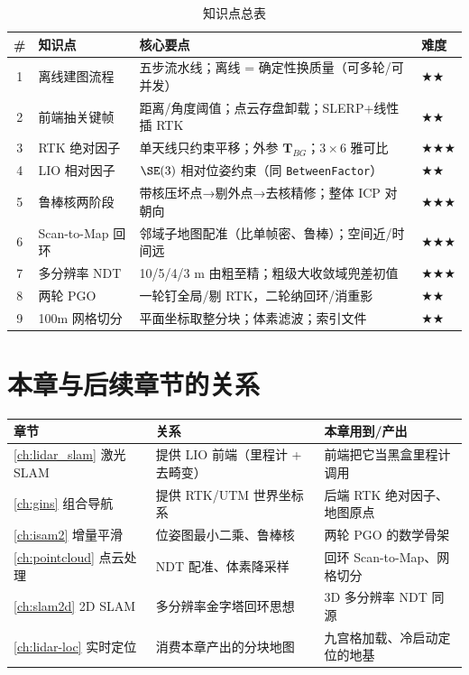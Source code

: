 \begin{table}[H]\centering\small
\caption{知识点总表}
\label{tab:lidar-map-summary}
\begin{tabular}{clll}
\toprule
\# & 知识点 & 核心要点 & 难度 \\
\midrule
1 & 离线建图流程 & 五步流水线；离线 = 确定性换质量（可多轮/可并发） & $\bigstar\bigstar$ \\
2 & 前端抽关键帧 & 距离/角度阈值；点云存盘卸载；SLERP+线性插 RTK & $\bigstar\bigstar$ \\
3 & RTK 绝对因子 & 单天线只约束平移；外参 $\mathbf{T}_{BG}$；$3\times6$ 雅可比 & $\bigstar\bigstar\bigstar$ \\
4 & LIO 相对因子 & $\SE(3)$ 相对位姿约束（同 \texttt{BetweenFactor}） & $\bigstar\bigstar$ \\
5 & 鲁棒核两阶段 & 带核压坏点→剔外点→去核精修；整体 ICP 对朝向 & $\bigstar\bigstar\bigstar$ \\
6 & Scan-to-Map 回环 & 邻域子地图配准（比单帧密、鲁棒）；空间近/时间远 & $\bigstar\bigstar\bigstar$ \\
7 & 多分辨率 NDT & 10/5/4/3 m 由粗至精；粗级大收敛域兜差初值 & $\bigstar\bigstar\bigstar$ \\
8 & 两轮 PGO & 一轮钉全局/剔 RTK，二轮纳回环/消重影 & $\bigstar\bigstar$ \\
9 & 100m 网格切分 & 平面坐标取整分块；体素滤波；索引文件 & $\bigstar\bigstar$ \\
\bottomrule
\end{tabular}
\end{table}

\section*{本章与后续章节的关系}
\begin{table}[H]\centering\small
\begin{tabular}{lll}
\toprule
章节 & 关系 & 本章用到/产出 \\
\midrule
\cref{ch:lidar_slam} 激光 SLAM & 提供 LIO 前端（里程计 + 去畸变） & 前端把它当黑盒里程计调用 \\
\cref{ch:gins} 组合导航 & 提供 RTK/UTM 世界坐标系 & 后端 RTK 绝对因子、地图原点 \\
\cref{ch:isam2} 增量平滑 & 位姿图最小二乘、鲁棒核 & 两轮 PGO 的数学骨架 \\
\cref{ch:pointcloud} 点云处理 & NDT 配准、体素降采样 & 回环 Scan-to-Map、网格切分 \\
\cref{ch:slam2d} 2D SLAM & 多分辨率金字塔回环思想 & 3D 多分辨率 NDT 同源 \\
\cref{ch:lidar-loc} 实时定位 & 消费本章产出的分块地图 & 九宫格加载、冷启动定位的地基 \\
\bottomrule
\end{tabular}
\end{table}

